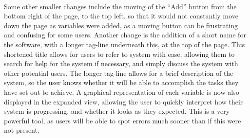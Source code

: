 \ \\
Some other smaller changes include the moving of the ``Add'' button from the bottom right of the page, to the top left. so that it would not constantly move down the page as variables were added, as a moving button can be frustrating and confusing for some users. Another change is the addition of a short name for the software, with a longer tag-line underneath this, at the top of the page. This shortened title allows for users to refer to system with ease, allowing them to search for help for the system if necessary, and simply discuss the system with other potential users. The longer tag-line allows for a brief description of the system, so the user knows whether it will be able to accomplish the tasks they have set out to achieve. A graphical representation of each variable is now also displayed in the expanded view, allowing the user to quickly interpret how their system is progressing, and whether it looks as they expected. This is a very powerful tool, as users will be able to spot errors much sooner than if this were not present.



